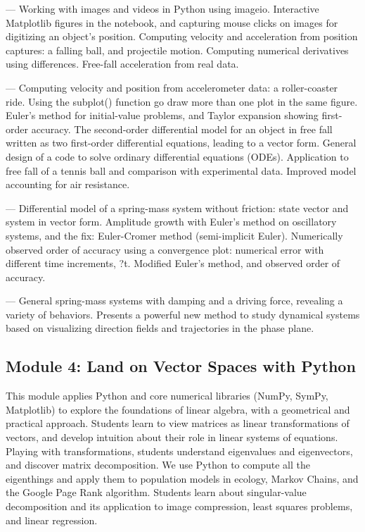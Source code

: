 \documentclass[10pt,journal,compsoc]{IEEEtran}
\begin{document}
\begin{description}[style=unboxed]

\item[Lesson 1: Catch things in motion]---
Working with images and videos in Python using imageio. Interactive Matplotlib figures in the notebook, and capturing mouse clicks on images for digitizing an object's position. Computing velocity and acceleration from position captures: a falling ball, and projectile motion. Computing numerical derivatives using differences. Free-fall acceleration from real data.

\item[Lesson 2: Step to the future]---
Computing velocity and position from accelerometer data: a roller-coaster ride. Using the subplot() function go draw more than one plot in the same figure. Euler's method for initial-value problems, and Taylor expansion showing first-order accuracy. The second-order differential model for an object in free fall written as two first-order differential equations, leading to a vector form. General design of a code to solve ordinary differential equations (ODEs). Application to free fall of a tennis ball and comparison with experimental data. Improved model accounting for air resistance.

\item[Lesson 3: Get with the oscillations]---
Differential model of a spring-mass system without friction: state vector and system in vector form. Amplitude growth with Euler's method on oscillatory systems, and the fix: Euler-Cromer method (semi-implicit Euler). Numerically observed order of accuracy using a convergence plot: numerical error with different time increments, ?t. Modified Euler's method, and observed order of accuracy.

\item[Lesson 4: Bird's-eye view of mechanical vibrations]---
General spring-mass systems with damping and a driving force, revealing a variety of behaviors. Presents a powerful new method to study dynamical systems based on visualizing direction fields and trajectories in the phase plane.

\end{description}

\subsection*{Module 4: Land on Vector Spaces with Python}
This module applies Python and core numerical libraries (NumPy, SymPy, Matplotlib) to explore the foundations of linear algebra, with a geometrical and practical approach. 
Students learn to view matrices as linear transformations of vectors, and develop intuition about their role in linear systems of equations. 
Playing with transformations, students understand eigenvalues and eigenvectors, and discover matrix decomposition. 
We use Python to compute all the eigenthings and apply them to population models in ecology, Markov Chains, and the Google Page Rank algorithm. 
Students learn about singular-value decomposition and its application to image compression, least squares problems, and linear regression.
\end{document}
